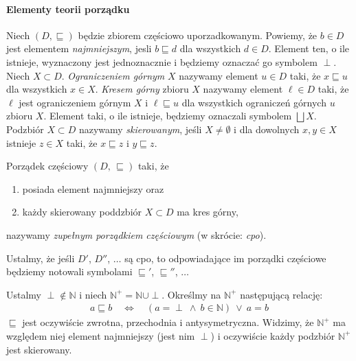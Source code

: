 \paragraph{Elementy teorii porządku} 
Niech \((D,\sqsubseteq)\) będzie zbiorem częściowo uporzadkowanym. Powiemy, że \(b\in D\) jest elementem \emph{najmniejszym}, jesli \(b\sqsubseteq d\) dla wszystkich \(d\in D\). Element ten, o ile istnieje, wyznaczony jest jednoznacznie i będziemy oznaczać go symbolem \(\perp\). Niech \(X\subset D\). \emph{Ograniczeniem górnym} \(X\) nazywamy element \(u\in D\) taki, że \(x\sqsubseteq u\) dla wszystkich \(x\in X\). \emph{Kresem górny} zbioru \(X\) nazywamy element \(\ell\in D\) taki, że \(\ell\) jest ograniczeniem górnym \(X\) i \(\ell\sqsubseteq u\) dla wszystkich ograniczeń górnych \(u\) zbioru \(X\). Element taki, o ile istnieje, będziemy oznaczali symbolem \(\bigsqcup X\). Podzbiór \(X\subset D\) nazywamy \emph{skierowanym}, jeśli \(X\neq\emptyset\) i dla dowolnych \(x, y\in X\) istnieje \(z\in X\) taki, że \(x\sqsubseteq z\) i \(y\sqsubseteq z\). 

\begin{definicja}%
Porządek częściowy \((D,\,\sqsubseteq)\) taki, że
\begin{enumerate}[label={(\alph*)}, ref={(\alph*)}]
  \setlength\itemsep{0em}
  \item posiada element najmniejszy oraz
  \item każdy skierowany poddzbiór \(X\subset D\) ma kres górny,
\end{enumerate}
  nazywamy \emph{zupełnym porządkiem częściowym} (w skrócie: \emph{cpo}).
\end{definicja}

Ustalmy, że jeśli \(D'\), \(D''\), \(\dots\)  są cpo, to odpowiadające im porządki częściowe będziemy notowali symbolami \(\sqsubseteq'\), \(\sqsubseteq''\), \(\dots\)

\begin{przyklad}\label{ex:scott_d0}
  Ustalmy \(\perp\not\in \mathbb{N}\) i niech \(\mathbb{N}^{+}=\mathbb{N}\cup{\perp}\). Określmy na \(\mathbb{N}^+\) następującą relację:
  \begin{align*}
    a \sqsubseteq b \quad \Leftrightarrow\quad (a=\perp\ \land\ b\in \mathbb{N})\ \lor\ a = b
  \end{align*}
  \(\sqsubseteq\) jest oczywiście zwrotna, przechodnia i antysymetryczna. Widzimy, że \(\mathbb{N}^{+}\) ma względem niej element najmniejszy (jest nim  \(\perp\)) i oczywiście każdy podzbiór \(\mathbb{N}^{+}\) jest skierowany. 
\end{przyklad}

